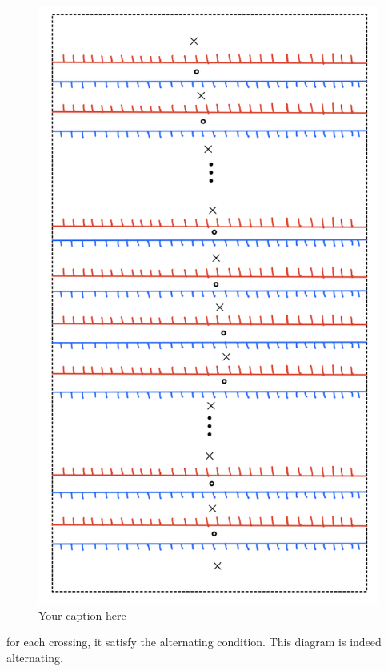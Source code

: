 \begin{figure}[H] %
    \centering
    \includegraphics[scale = 0.95]{diagrams/natural_alternating_diagrams/12.png} %
    \caption{Your caption here}
    \label{fig:your-label}
\end{figure}
for each crossing, it satisfy the alternating condition. This diagram is indeed alternating.